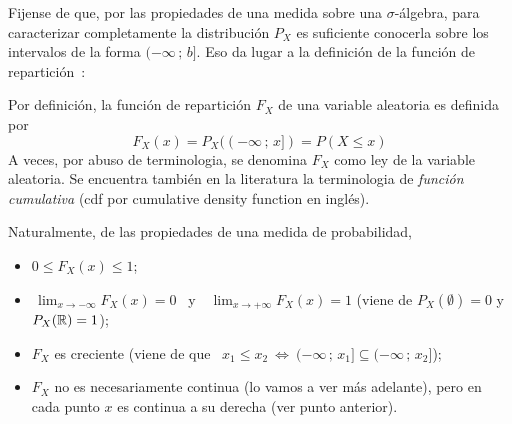Fijense de que, por las  propiedades de una medida sobre una $\sigma$-\'algebra,
para caracterizar completamente la  distribuci\'on $P_X$ es suficiente conocerla
sobre  los intervalos de  la forma  $(-\infty \,  ; \,  b]$. Eso  da lugar  a la
definici\'on  de  la funci\'on  de  repartici\'on~\cite{AthLah06, Coh13,  Bre88,
  HogMck13}:
%
\begin{definicion}
  Por  definici\'on,  la  funci\'on  de  repartici\'on  $F_X$  de  una  variable
  aleatoria es definida por
  \[
  F_X(x) = P_X((-\infty \, ; \, x]) = P(X \le x)
  \]
  A veces, por abuso de terminologia,  se denomina $F_X$ como ley de la variable
  aleatoria. Se  encuentra tambi\'en  en la literatura  la terminologia  de {\it
    funci\'on cumulativa} (cdf por cumulative density function en ingl\'es).
\end{definicion}
%
Naturalmente, de las propiedades de una medida de probabilidad,
%
\begin{itemize}
\item $0 \le F_X(x) \le 1$;
%
\item $\displaystyle \, \lim_{x \to -\infty} F_X(x) = 0$ \ y \ $\displaystyle \,
  \lim_{x \to +\infty} F_X(x) = 1$  (viene de $P_X(\emptyset) = 0$ y $P_X(\mathbb{R})
  = 1$);
%
\item  $F_X$ es creciente  \big(viene de  que \  $x_1 \le  x_2 \:  \Leftrightarrow \:
  (-\infty \, ; \, x_1] \subseteq (-\infty \, ; \, x_2]$\big);
%
\item $F_X$ no es necesariamente continua  (lo vamos a ver m\'as adelante), pero
  en cada punto $x$ es continua a su derecha (ver punto anterior).
\end{itemize}


